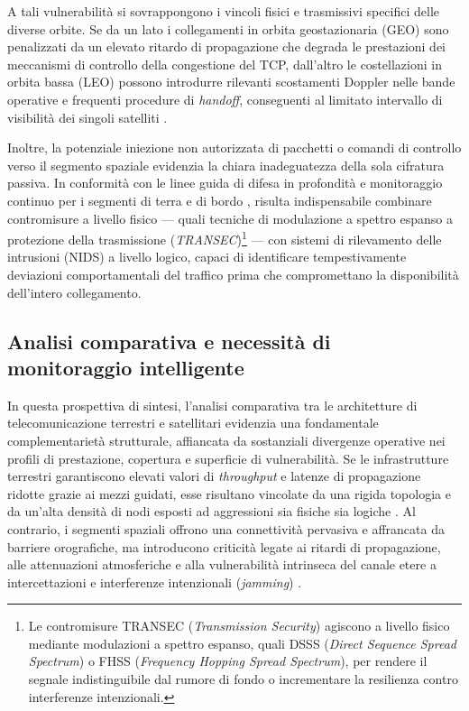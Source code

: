 A tali vulnerabilità si sovrappongono i vincoli fisici e trasmissivi specifici delle diverse orbite. 
Se da un lato i collegamenti in orbita geostazionaria (GEO) sono penalizzati da un elevato ritardo di propagazione che degrada le prestazioni dei meccanismi di controllo della congestione del TCP, dall'altro le costellazioni in orbita bassa (LEO) possono introdurre rilevanti scostamenti Doppler nelle bande operative e frequenti procedure di \textit{handoff}, conseguenti al limitato intervallo di visibilità dei singoli satelliti \cite{kodheli2021}.

Inoltre, la potenziale iniezione non autorizzata di pacchetti o comandi di controllo verso il segmento spaziale evidenzia la chiara inadeguatezza della sola cifratura passiva. 
In conformità con le linee guida di difesa in profondità e monitoraggio continuo per i segmenti di terra e di bordo \cite{nist2022}, risulta indispensabile combinare contromisure a livello fisico — quali tecniche di modulazione a spettro espanso a protezione della trasmissione (\textit{TRANSEC})\footnote{Le contromisure TRANSEC (\textit{Transmission Security}) agiscono a livello fisico mediante modulazioni a spettro espanso, quali DSSS (\textit{Direct Sequence Spread Spectrum}) o FHSS (\textit{Frequency Hopping Spread Spectrum}), per rendere il segnale indistinguibile dal rumore di fondo o incrementare la resilienza contro interferenze intenzionali.} — con sistemi di rilevamento delle intrusioni (NIDS) a livello logico, capaci di identificare tempestivamente deviazioni comportamentali del traffico prima che compromettano la disponibilità dell'intero collegamento.

\subsection{Analisi comparativa e necessità di monitoraggio intelligente}
\label{subsec:analisi_comparativa_monitoraggio}

In questa prospettiva di sintesi, l'analisi comparativa tra le architetture di telecomunicazione terrestri e satellitari evidenzia una fondamentale complementarietà strutturale, affiancata da sostanziali divergenze operative nei profili di prestazione, copertura e superficie di vulnerabilità. 
Se le infrastrutture terrestri garantiscono elevati valori di \textit{throughput} e latenze di propagazione ridotte grazie ai mezzi guidati, esse risultano vincolate da una rigida topologia e da un'alta densità di nodi esposti ad aggressioni sia fisiche sia logiche \cite{tanenbaum2020}. 
Al contrario, i segmenti spaziali offrono una connettività pervasiva e affrancata da barriere orografiche, ma introducono criticità legate ai ritardi di propagazione, alle attenuazioni atmosferiche e alla vulnerabilità intrinseca del canale etere a intercettazioni e interferenze intenzionali (\textit{jamming}) \cite{kodheli2021}.

